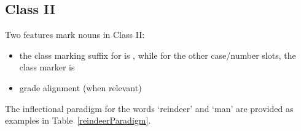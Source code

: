 \FB




\subsection{Class II}\label{NclassII}
Two features mark nouns in Class II: 
\begin{itemize}
\item{the class marking suffix for  is , while for the other case/number slots, the class marker is }
\item{ grade alignment (when relevant)}
\end{itemize}
The inflectional paradigm for the words  ‘reindeer’ and  ‘man’ are provided as examples in Table~\vref{reindeerParadigm}.

